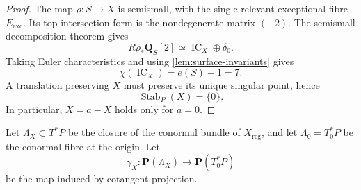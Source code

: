 \documentclass[10pt]{amsart}
\numberwithin{equation}{section}
\theoremstyle{definition}
\theoremstyle{remark}
\newcommand{\QQ}{\mathbf Q}
\newcommand{\PP}{\mathbf P}
\newcommand{\IC}{\operatorname{IC}}
\newcommand{\Stab}{\operatorname{Stab}}
\newcommand{\reg}{\mathrm{reg}}
\newcommand{\exc}{\mathrm{exc}}
\begin{document}
\begin{proof}
The map $\rho:S\to X$ is semismall, with the single relevant exceptional
fibre $E_{\exc}$.  Its top intersection form is the nondegenerate matrix
$(-2)$.  The semismall decomposition theorem
\cite[Theorem~3.4.1]{deCataldoMigliorini2002} gives
\begin{equation}
 R\rho_*\QQ_S[2]\simeq\IC_X\oplus\delta_0.
\label{eq:semismall}
\end{equation}
Taking Euler characteristics and using \cref{lem:surface-invariants} gives
\begin{equation}
 \chi(\IC_X)=e(S)-1=7.
\label{eq:chi-seven}
\end{equation}
A translation preserving $X$ must preserve its unique singular point, hence
\begin{equation}
 \Stab_P(X)=\{0\}.
\label{eq:stabilizer}
\end{equation}
In particular, $X=a-X$ holds only for $a=0$.
\end{proof}

Let $\Lambda_X\subset T^*P$ be the closure of the conormal bundle of
$X_{\reg}$, and let $\Lambda_0=T_0^*P$ be the conormal fibre at the origin.
Let
\[
 \gamma_X:\PP(\Lambda_X)\longrightarrow\PP(T_0^*P)
\]
be the map induced by cotangent projection.
\end{document}
